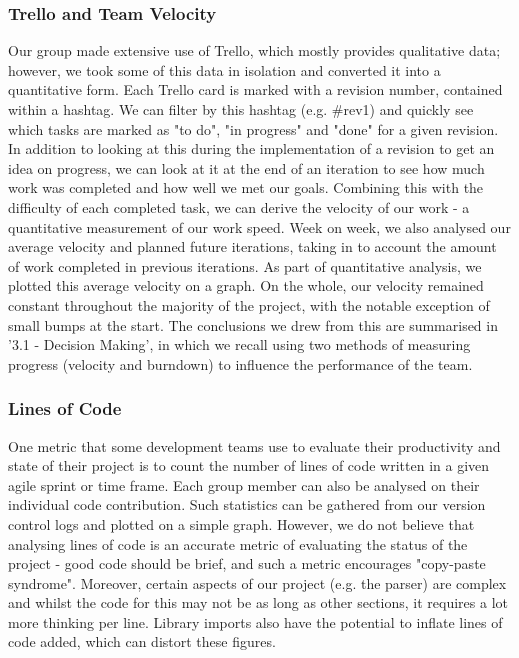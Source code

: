 \documentclass[a4paper, 11pt]{article}
\begin{document}
\subsubsection{ Trello and Team Velocity}
Our group made extensive use of Trello, which mostly provides qualitative data; however, we took some of this data in isolation and converted it into a quantitative form. 
Each Trello card is marked with a revision number, contained within a hashtag.
We can filter by this hashtag (e.g. \#rev1) and quickly see which tasks are marked as "to do", "in progress" and "done" for a given revision. In addition to looking at this during the implementation of a revision to get an idea on progress, we can look at it at the end of an iteration to see how much work was completed and how well we met our goals. Combining this with the difficulty of each completed task, we can derive the velocity of our work - a quantitative measurement of our work speed. 
Week on week, we also analysed our average velocity and planned future iterations, taking in to account the amount of work completed in previous iterations. As part of quantitative analysis, we plotted this average velocity on a graph. On the whole, our velocity remained constant throughout the majority of the project, with the notable exception of small bumps at the start. The conclusions we drew from this are summarised in '3.1 - Decision Making', in which we recall using two methods of measuring progress (velocity and burndown) to influence the performance of the team.
\subsubsection{ Lines of Code}
One metric that some development teams use to evaluate their productivity and state of their project is to count the number of lines of code written in a given agile sprint or time frame. Each group member can also be analysed on their individual code contribution. Such statistics can be gathered from our version control logs and plotted on a simple graph.
However, we do not believe that analysing lines of code is an accurate metric of evaluating the status of the project - good code should be brief, and such a metric encourages "copy-paste syndrome". Moreover, certain aspects of our project (e.g. the parser) are complex and whilst the code for this may not be as long as other sections, it requires a lot more thinking per line. Library imports also have the potential to inflate lines of code added, which can distort these figures.
\end{document}
